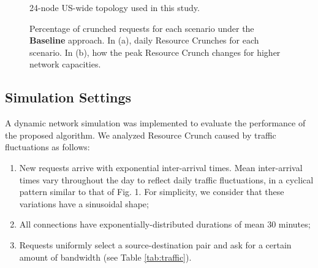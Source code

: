 \documentclass[journal]{IEEEtran}
\begin{document}
\begin{figure}[!t]
{
  }
 \caption{24-node US-wide topology used in this study.}
 \label{fig:USNet}
 
\end{figure}

\begin{figure}[!t] 
\centering
  
 \caption{Percentage of crunched requests for each scenario under the \textbf{Baseline} approach. In (a), daily Resource Crunches for each scenario. In (b), how the peak Resource Crunch changes for higher network capacities.}
 \label{fig:rc_profile} 
\end{figure}

\subsection{Simulation Settings} \label{sec:simset}

A dynamic network simulation was implemented to evaluate the performance of the proposed algorithm. We analyzed Resource Crunch caused by traffic fluctuations as follows:
\begin{enumerate}[label=\textit{\alph*.}]
 \item New requests arrive with exponential inter-arrival times. Mean inter-arrival times vary throughout the day to reflect daily traffic fluctuations, in a cyclical pattern similar to that of Fig. 1. For simplicity, we consider that these variations have a sinusoidal shape;
 \item All connections have exponentially-distributed durations of mean 30 minutes;
 \item Requests uniformly select a source-destination pair and ask for a certain amount of bandwidth (see Table \ref{tab:traffic}).
\end{enumerate}
\end{document}

